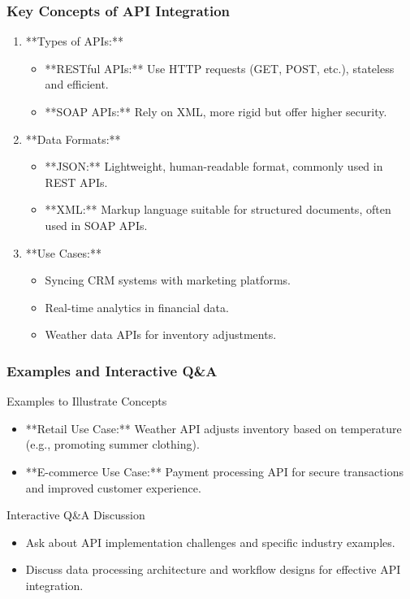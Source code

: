 \documentclass[aspectratio=169]{beamer}
\begin{document}
\begin{frame}[fragile]
    \frametitle{Key Concepts of API Integration}
    \begin{enumerate}
        \item **Types of APIs:**
            \begin{itemize}
                \item **RESTful APIs:** Use HTTP requests (GET, POST, etc.), stateless and efficient.
                \item **SOAP APIs:** Rely on XML, more rigid but offer higher security.
            \end{itemize}
            
        \item **Data Formats:**
            \begin{itemize}
                \item **JSON:** Lightweight, human-readable format, commonly used in REST APIs.
                \item **XML:** Markup language suitable for structured documents, often used in SOAP APIs.
            \end{itemize}
            
        \item **Use Cases:**
            \begin{itemize}
                \item Syncing CRM systems with marketing platforms.
                \item Real-time analytics in financial data.
                \item Weather data APIs for inventory adjustments.
            \end{itemize}
    \end{enumerate}
\end{frame}

\begin{frame}[fragile]
    \frametitle{Examples and Interactive Q\&A}
    \begin{block}{Examples to Illustrate Concepts}
        \begin{itemize}
            \item **Retail Use Case:** Weather API adjusts inventory based on temperature (e.g., promoting summer clothing).
            \item **E-commerce Use Case:** Payment processing API for secure transactions and improved customer experience.
        \end{itemize}
    \end{block}
    
    \begin{alertblock}{Interactive Q\&A Discussion}
        \begin{itemize}
            \item Ask about API implementation challenges and specific industry examples.
            \item Discuss data processing architecture and workflow designs for effective API integration.
        \end{itemize}
    \end{alertblock}
\end{frame}
\end{document}
